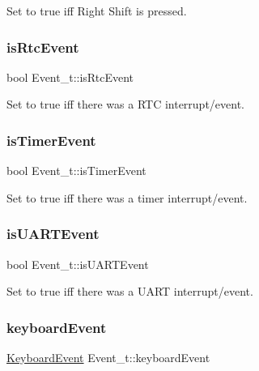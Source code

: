 Set to true iff Right Shift is pressed. 

\mbox{\label{group__event_ga8161d752a03a628ed75607ba51dcf534}} 
\subsubsection{\texorpdfstring{is\+Rtc\+Event}{isRtcEvent}}
{\footnotesize\ttfamily bool Event\+\_\+t\+::is\+Rtc\+Event}



Set to true iff there was a R\+TC interrupt/event. 

\mbox{\label{group__event_ga9ed8eea2d6d0593ed3dd328c0d39cff4}} 
\subsubsection{\texorpdfstring{is\+Timer\+Event}{isTimerEvent}}
{\footnotesize\ttfamily bool Event\+\_\+t\+::is\+Timer\+Event}



Set to true iff there was a timer interrupt/event. 

\mbox{\label{group__event_ga90aa0e2d62ddd6a7df1d4028f5598871}} 
\subsubsection{\texorpdfstring{is\+U\+A\+R\+T\+Event}{isUARTEvent}}
{\footnotesize\ttfamily bool Event\+\_\+t\+::is\+U\+A\+R\+T\+Event}



Set to true iff there was a U\+A\+RT interrupt/event. 

\mbox{\label{group__event_ga7754ae75522696c89ae768740cb2720c}} 
\subsubsection{\texorpdfstring{keyboard\+Event}{keyboardEvent}}
{\footnotesize\ttfamily \mbox{\hyperlink{struct_keyboard_event}{Keyboard\+Event}} Event\+\_\+t\+::keyboard\+Event}




